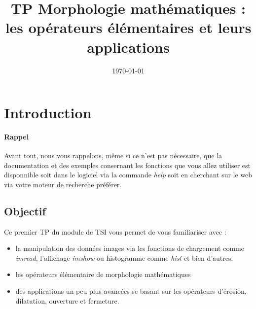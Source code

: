 \documentclass[10pt,a4paper]{article}
\title{TP Morphologie math\'{e}matiques : les op\'{e}rateurs \'{e}l\'{e}mentaires et leurs applications}
\author{} %
\date{\today}
\begin{document}
\maketitle

\section{Introduction} 
\paragraph{Rappel}
Avant tout, nous vous rappelons, m\^{e}me si ce n'est pas n\'{e}cessaire, que la documentation et des exemples consernant les fonctions que vous allez utiliser est disponnible soit dans le logiciel via la commande \textit{help} soit en cherchant sur le web via votre moteur de recherche pr\'{e}f\'{e}rer. 

\subsection{Objectif}
Ce premier TP du module de TSI vous permet de vous familiariser avec :
\begin{itemize}
	\item la manipulation des donn\'{e}es images via les fonctions de chargement comme \textit{imread}, l'affichage \textit{imshow} ou histogramme comme \textit{hist} et bien d'autres.
	\item les op\'{e}rateurs \'{e}l\'{e}mentaire de morphologie math\'{e}matiques
	\item des applications un peu plus avanc\'{e}es se basant sur les op\'{e}rateurs d’\'{e}rosion, dilatation, ouverture et fermeture.
\end{itemize}
\end{document}
